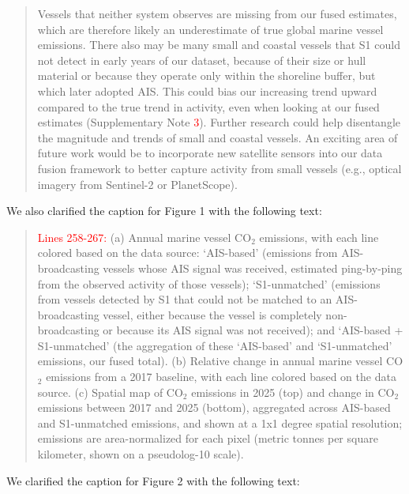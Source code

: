 \documentclass[11pt]{article}
\begin{document}
\begin{quote}
Vessels that neither system observes are missing from our fused estimates, which are therefore likely an underestimate of true global marine vessel emissions. There also may be many small and coastal vessels that S1 could not detect in early years of our dataset, because of their size or hull material or because they operate only within the shoreline buffer, but which later adopted AIS. This could bias our increasing trend upward compared to the true trend in activity, even when looking at our fused estimates (Supplementary Note \textcolor{red}{3}). Further research could help disentangle the magnitude and trends of small and coastal vessels. An exciting area of future work would be to incorporate new satellite sensors into our data fusion framework to better capture activity from small vessels (e.g., optical imagery from Sentinel-2 or PlanetScope).
\end{quote}

We also clarified the caption for Figure 1 with the following text:

\begin{quote}
\textcolor{red}{Lines 258-267:}
(a) Annual marine vessel CO$_{2}$ emissions, with each line colored based on the data source: `AIS-based' (emissions from AIS-broadcasting vessels whose AIS signal was received, estimated ping-by-ping from the observed activity of those vessels); `S1-unmatched' (emissions from vessels detected by S1 that could not be matched to an AIS-broadcasting vessel, either because the vessel is completely non-broadcasting or because its AIS signal was not received); and `AIS-based + S1-unmatched' (the aggregation of these `AIS-based' and `S1-unmatched' emissions, our fused total). (b) Relative change in annual marine vessel CO$_{2}$ emissions from a 2017 baseline, with each line colored based on the data source. (c) Spatial map of CO$_{2}$ emissions in 2025 (top) and change in CO$_{2}$ emissions between 2017 and 2025 (bottom), aggregated across AIS-based and S1-unmatched emissions, and shown at a 1x1 degree spatial resolution; emissions are area-normalized for each pixel (metric tonnes per square kilometer, shown on a pseudolog-10 scale).
\end{quote}

We clarified the caption for Figure 2 with the following text:
\end{document}
